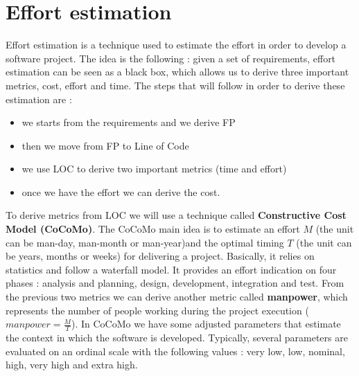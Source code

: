 \section{Effort estimation}
Effort estimation is a technique used to estimate the effort in order to develop a software project. The idea is the following : given a set of requirements, effort estimation can be seen as a black box, which allows us to derive three important metrics, cost, effort and time. The steps that will follow in order to derive these estimation are :
\begin{itemize}
    \item we starts from the requirements and we derive FP
    \item then we move from FP to Line of Code
    \item we use LOC to derive two important metrics (time and effort)
    \item once we have the effort we can derive the cost.
\end{itemize}
To derive metrics from LOC we will use a technique called \textbf{Constructive Cost Model (CoCoMo)}. The CoCoMo main idea is to estimate an effort $M$ (the unit can be man-day, man-month or man-year)and the optimal timing $T$ (the unit can be years, months or weeks) for delivering a project. Basically, it relies on statistics and follow a waterfall model. It provides an effort indication on four phases : analysis and planning, design, development, integration and test. From the previous two metrics we can derive another metric called \textbf{manpower}, which represents the number of people working during the project execution ($manpower = \frac{M}{T}$). In CoCoMo we have some adjusted parameters that estimate the context in which the software is developed. Typically, several parameters are evaluated on an ordinal scale with the following values : very low, low, nominal, high, very high and extra high.

